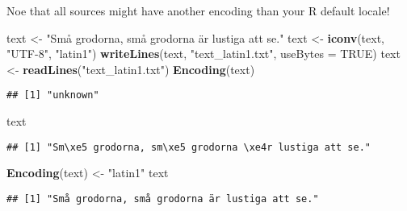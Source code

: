 \documentclass[ignorenonframetext,]{beamer}
\newenvironment{Shaded}{\begin{snugshade}}{\end{snugshade}}
\newcommand{\KeywordTok}[1]{\textcolor[rgb]{0.13,0.29,0.53}{\textbf{{#1}}}}
\newcommand{\DataTypeTok}[1]{\textcolor[rgb]{0.13,0.29,0.53}{{#1}}}
\newcommand{\StringTok}[1]{\textcolor[rgb]{0.31,0.60,0.02}{{#1}}}
\newcommand{\OtherTok}[1]{\textcolor[rgb]{0.56,0.35,0.01}{{#1}}}
\newcommand{\NormalTok}[1]{{#1}}
\begin{document}
\begin{frame}[fragile]{Noe that all sources might have another encoding
than your R default locale!}

\begin{Shaded}
\begin{Highlighting}[]
\NormalTok{text <-}\StringTok{ "Små grodorna, små grodorna är lustiga att se."}
\NormalTok{text <-}\StringTok{ }\KeywordTok{iconv}\NormalTok{(text, }\StringTok{"UTF-8"}\NormalTok{, }\StringTok{"latin1"}\NormalTok{)}
\KeywordTok{writeLines}\NormalTok{(text, }\StringTok{"text_latin1.txt"}\NormalTok{, }\DataTypeTok{useBytes =} \OtherTok{TRUE}\NormalTok{)}
\NormalTok{text <-}\StringTok{ }\KeywordTok{readLines}\NormalTok{(}\StringTok{"text_latin1.txt"}\NormalTok{)}
\KeywordTok{Encoding}\NormalTok{(text)}
\end{Highlighting}
\end{Shaded}

\begin{verbatim}
## [1] "unknown"
\end{verbatim}

\begin{Shaded}
\begin{Highlighting}[]
\NormalTok{text}
\end{Highlighting}
\end{Shaded}

\begin{verbatim}
## [1] "Sm\xe5 grodorna, sm\xe5 grodorna \xe4r lustiga att se."
\end{verbatim}

\begin{Shaded}
\begin{Highlighting}[]
\KeywordTok{Encoding}\NormalTok{(text) <-}\StringTok{ "latin1"}
\NormalTok{text}
\end{Highlighting}
\end{Shaded}

\begin{verbatim}
## [1] "Små grodorna, små grodorna är lustiga att se."
\end{verbatim}

\end{frame}
\end{document}
